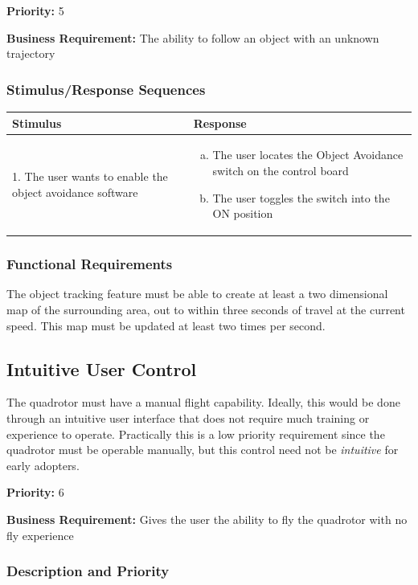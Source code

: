 \documentclass[english]{article}
\numberwithin{equation}{section} %
\begin{document}
\textbf{Priority:} 5

\textbf{Business Requirement:} The ability to follow an object with an unknown trajectory

\subsubsection{Stimulus/Response Sequences}

\begin{longtable}{p{3cm} | p{8.5cm}}
\hline
\textbf{Stimulus} & \textbf{Response}\\
\hline
1. The user wants to enable the object avoidance software &
\begin{enumerate}[(a)]\itemsep1pt %
\item The user locates the Object Avoidance switch on the control board
\item The user toggles the switch into the ON position
\end{enumerate}
\\ 
\hline
\end{longtable}
\subsubsection{Functional Requirements}
The object tracking feature must be able to create at least a two dimensional map of the surrounding area, out to within three seconds of travel at the current speed. This map must be updated at least two times per second.


\bigskip
\subsection{Intuitive User Control}
The quadrotor must have a manual flight capability. Ideally, this would be done through an intuitive user interface that does not require much training or experience to operate. Practically this is a low priority requirement since the quadrotor must be operable manually, but this control need not be \textit{intuitive} for early adopters.

\textbf{Priority:} 6

\textbf{Business Requirement:} Gives the user the ability to fly the quadrotor with no fly experience
 
\subsubsection{Description and Priority}
\end{document}
